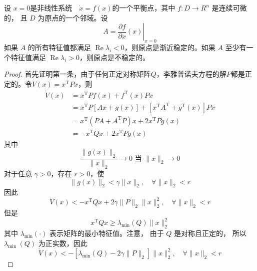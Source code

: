 \begin{theorem}
    设 $x=0$是非线性系统$\quad \dot{x}=f(x)$的一个平衡点，其中 $f: D \rightarrow R^n$ 是连续可微的，
    且 $D$ 为原点的一个邻域。设
    \begin{equation}
        A=\left.\frac{\partial f}{\partial x}(x)\right|_{x=0}
    \end{equation}
    如果 $A$ 的所有特征值都满足 $\operatorname{Re} \lambda_i<0$，则原点是渐近稳定的。如果 $A$ 至少有一个特征值满足 $\operatorname{Re} \lambda_i>0$，则原点是不稳定的。
\end{theorem}
\begin{proof}
    首先证明第一条，由于任何正定对称矩阵$Q$，李雅普诺夫方程的解$P$都是正定的。令$V(x)=x^{\mathrm{T}} P x$，则
    \begin{equation}
        \begin{aligned}
        \dot{V}(x) & =x^{\mathrm{T}} P f(x)+f^{\mathrm{T}}(x) P x \\
        & =x^{\mathrm{T}} P[A x+g(x)]+\left[x^{\mathrm{T}} A^{\mathrm{T}}+g^{\mathrm{T}}(x)\right] P x \\
        & =x^{\mathrm{T}}\left(P A+A^{\mathrm{T}} P\right) x+2 x^{\mathrm{T}} P g(x) \\
        & =-x^{\mathrm{T}} Q x+2 x^{\mathrm{T}} P g(x)
        \end{aligned}
    \end{equation}
    其中
    \begin{equation}
        \frac{\|g(x)\|_2}{\|x\|_2} \rightarrow 0 \text { 当 }\|x\|_2 \rightarrow 0
    \end{equation}
    对于任意 $\gamma>0$，存在 $r>0$，使
    \begin{equation}
        \|g(x)\|_2<\gamma\|x\|_2,\quad \forall\|x\|_2<r
    \end{equation}
    因此
    \begin{equation}
        \dot{V}(x)<-x^{\mathrm{T}} Q x+2 \gamma\|P\|_2\|x\|_2^2,\quad \forall\|x\|_2<r
    \end{equation}
    但是
    \begin{equation}
        x^{\mathrm{T}} Q x \geqslant \lambda_{\min }(Q)\|x\|_2^2
    \end{equation}
    其中 $\lambda_{\min }(\cdot)$ 表示矩阵的最小特征值。注意， 由于 $Q$ 是对称且正定的，
    所以 $\lambda_{\text {min }}(Q)$ 为正实数，因此
    \begin{equation}
        \dot{V}(x)<-\left[\lambda_{\min }(Q)-2 \gamma\|P\|_2\right]\|x\|_2^2,\quad \forall\|x\|_2<r
    \end{equation}

\end{proof}
